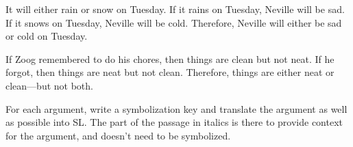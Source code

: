 \begin{exercises}

\item It will either rain or snow on Tuesday. If it rains on Tuesday, Neville will be sad. If it snows on Tuesday, Neville will be cold. Therefore, Neville will either be sad or cold on Tuesday.


\item If Zoog remembered to do his chores, then things are clean but not neat. If he forgot, then things are neat but not clean. Therefore, things are either neat or clean---but not both.


\end{exercises}


\noindent\problempart For each argument, write a symbolization key and translate the argument as well as possible into SL. The part of the passage in italics is there to provide context for the argument, and doesn't need to be symbolized.

